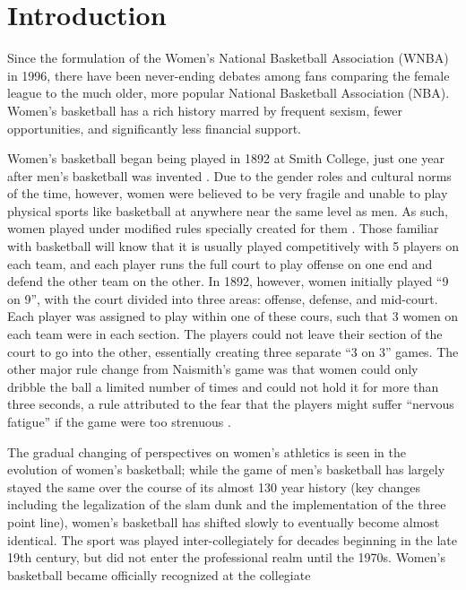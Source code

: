\documentclass[12pt]{article}
\begin{document}
\section{Introduction}
\hspace*{10mm}
Since the formulation of the Women’s National Basketball Association (WNBA) in 1996, there have been never-ending debates among fans comparing the female 
league to the much older, more popular National Basketball Association (NBA). Women’s basketball has a rich history marred by frequent sexism, fewer 
opportunities, and significantly less financial support.
\par
Women’s basketball began being played in 1892 at Smith College, just one year after men’s basketball was invented \citep{Shattering_The_Glass}. Due to the 
gender roles and cultural norms of the time, however, women were believed to be very fragile and unable to play physical sports like 
basketball at anywhere near the same level as men. As such, women played under modified rules specially created for them \citep{WNBA_Hist}. Those familiar 
with basketball will know that it is usually played competitively with 5 players on each team, and each player runs the full court to play offense on one 
end and defend the other team on the other. In 1892, however, women initially played “9 on 9”, with the court divided into three areas: offense, 
defense, and mid-court. Each player was assigned to play within one of these cours, such that 3 women on each team were in each section. The 
players could not leave their section of the court to go into the other, essentially creating three separate “3 on 3” games. The other major rule change 
from Naismith's game was that women could only dribble the ball a limited number of times and could not hold it for more than three seconds, a rule 
attributed to the fear that the players might suffer “nervous fatigue” if the game were too strenuous \citep{WNBA_Hist}.
\par
The gradual changing of perspectives on women’s athletics is seen in the evolution of women’s basketball; while the game of men’s basketball has largely 
stayed the same over the course of its almost 130 year history (key changes including the legalization of the slam dunk and the implementation of the 
three point line), women’s basketball has shifted slowly to eventually become almost identical. The sport was played inter-collegiately for decades 
beginning in the late 19th century, but did not enter the professional realm until the 1970s. Women's basketball became officially recognized at the collegiate 
\end{document}
